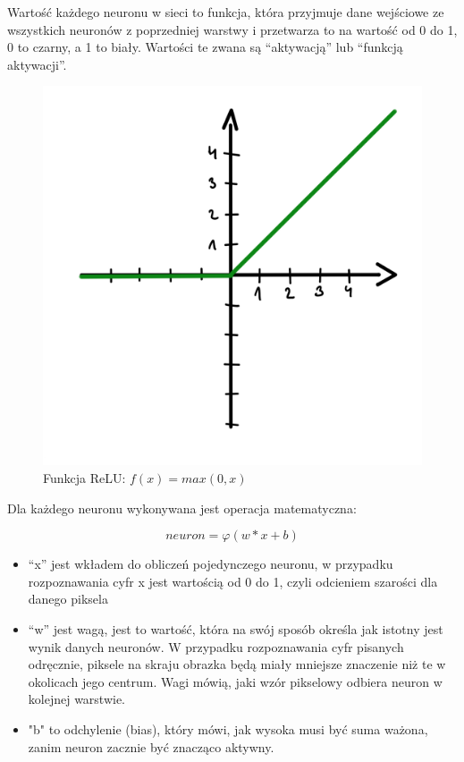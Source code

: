 \documentclass[brudnopis]{xmgr}
\begin{document}
Wartość każdego neuronu w sieci to funkcja, która przyjmuje dane wejściowe ze wszystkich neuronów z poprzedniej warstwy i przetwarza to na wartość od 0 do 1, 0 to czarny, a 1 to biały. Wartości te zwana są “aktywacją” lub “funkcją aktywacji”.


\begin{figure}[!tbh]
\centering
\includegraphics[width=.8\hsize]{fig/4}
\caption{Funkcja ReLU: $f(x) = max(0, x)$\label{RYS.3}}
\end{figure}

Dla każdego neuronu wykonywana jest operacja matematyczna:

\begin{equation}
neuron  = φ (w * x + b)
\end{equation}

\begin{itemize}
\item “x” jest wkładem do obliczeń pojedynczego neuronu, w przypadku rozpoznawania cyfr x jest wartością od 0 do 1, czyli odcieniem szarości dla danego piksela
\item “w” jest wagą, jest to wartość, która na swój sposób określa jak istotny jest wynik danych neuronów. W przypadku rozpoznawania cyfr pisanych odręcznie, piksele na skraju obrazka będą miały mniejsze znaczenie niż te w okolicach jego centrum. Wagi mówią, jaki wzór pikselowy odbiera neuron w kolejnej warstwie.
\item "b" to odchylenie (bias), który mówi, jak wysoka musi być suma ważona, zanim neuron zacznie być znacząco aktywny.
\end{itemize}
\end{document}
